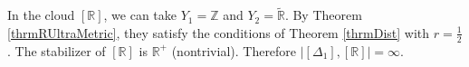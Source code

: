 \begin{corollary}
  In the cloud $[\mathbb{R}]$, we can take $Y_{1} = \mathbb{Z}$ and
  $Y_{2} = \widetilde{\mathbb{R}}$. By Theorem
  \ref{thrmRUltraMetric}, they satisfy the conditions of Theorem
  \ref{thrmDist} with $r = \frac{1}{2}$. The stabilizer of
  $[\mathbb{R}]$ is $\mathbb{R}^{+}$ (nontrivial). Therefore
  $\big|[\Delta_{1}],[\mathbb{R}]\big| = \infty$.
\end{corollary}
